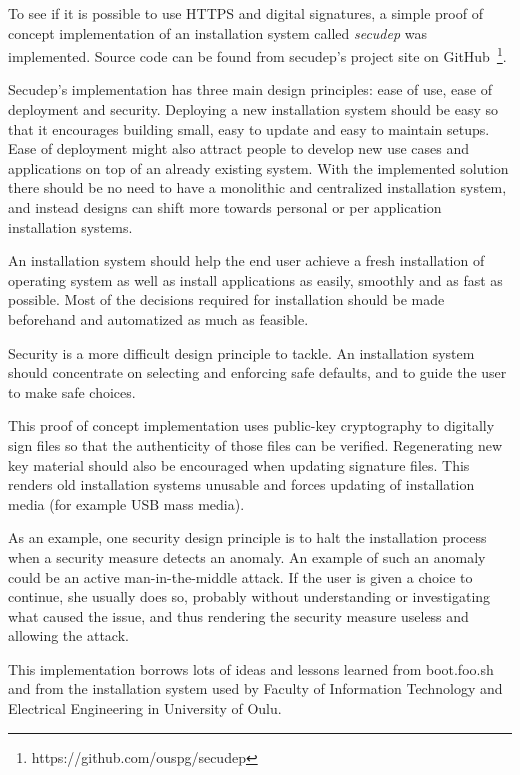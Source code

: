 
To see if it is possible to use HTTPS and digital signatures, a simple
proof of concept implementation of an installation system
called \emph{secudep} was implemented. Source code can be found from
secudep's project site on
GitHub~\footnote{https://github.com/ouspg/secudep}.

Secudep's implementation has three main design principles: ease of
use, ease of deployment and security. Deploying a new installation
system should be easy so that it encourages building small, easy to
update and easy to maintain setups. Ease of deployment might also
attract people to develop new use cases and applications on top of an
already existing system. With the implemented solution there should be
no need to have a monolithic and centralized installation system, and
instead designs can shift more towards personal or per application
installation systems.

An installation system should help the end user achieve a fresh
installation of operating system as well as install applications as
easily, smoothly and as fast as possible. Most of the decisions
required for installation should be made beforehand and automatized as
much as feasible.

Security is a more difficult design principle to tackle. An
installation system should concentrate on selecting and enforcing safe
defaults, and to guide the user to make safe choices.

This proof of concept implementation uses public-key cryptography to
digitally sign files so that the authenticity of those files can be
verified. Regenerating new key material should also be encouraged when
updating signature files. This renders old installation systems
unusable and forces updating of installation media (for example USB
mass media).

As an example, one security design principle is to halt the
installation process when a security measure detects an anomaly. An
example of such an anomaly could be an active man-in-the-middle
attack. If the user is given a choice to continue, she usually does
so, probably without understanding or investigating what caused the
issue, and thus rendering the security measure useless and allowing
the attack.

This implementation borrows lots of ideas and lessons learned from
boot.foo.sh~\cite{boot-foo-sh} and from the installation system used
by Faculty of Information Technology and Electrical Engineering in
University of Oulu.

